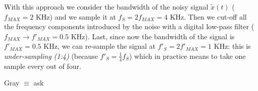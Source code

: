\begin{appendices}
With this approach we consider the bandwidth of the noisy signal $\tilde x(t)$ ($f_{MAX} = 2$ KHz) and we sample it at $f_S = 2 f_{MAX} = 4$ KHz. Then we cut-off all the frequency components introduced by the noise with a digital low-pass filter ($f_{MAX} \rightarrow f'_{MAX} = 0.5$ KHz). Last, since now the bandwidth of the signal is $f'_{MAX} = 0.5$ KHz, we can re-sample the signal at $f'_S = 2 f'_{MAX} = 1$ KHz: this is \emph{under-sampling (1:4)} (because $f'_S = \frac{1}{4} f_S$) which in practice means to take one sample every out of four.

{\Huge Gray $\equiv$ ask}

\end{appendices}